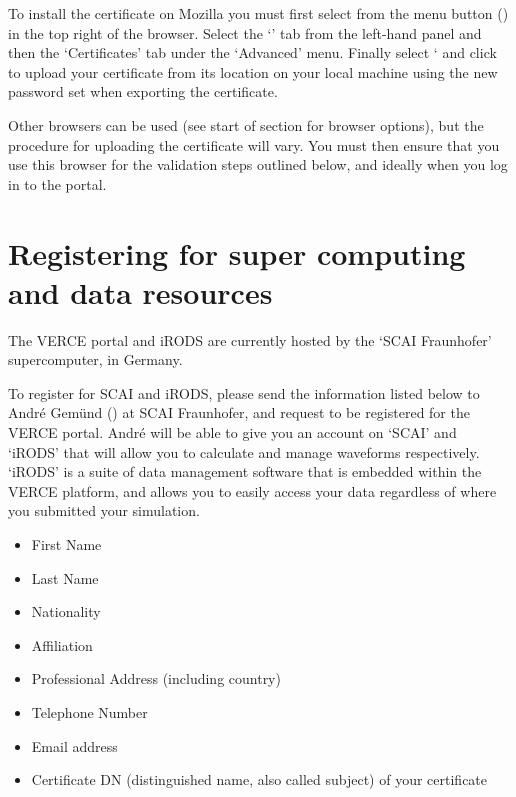 \documentclass[english]{book}
\begin{document}
To install the certificate on Mozilla you must first select
 from the menu button () in the top right
of the browser. Select the ‘’ tab from the left-hand panel
and then the ‘Certificates’ tab under the ‘Advanced’ menu. Finally
select ‘ and click  to upload your
certificate from its location on your local machine using the new
password set when exporting the certificate.

Other browsers can be used (see start of section for browser options),
but the procedure for uploading the certificate will vary. You must then
ensure that you use this browser for the validation steps outlined
below, and ideally when you log in to the portal.


\section{Registering for super computing and data resources}
\label{\detokenize{Section3:registering-for-super-computing-and-data-resources}}
The VERCE portal and iRODS are currently hosted by the ‘SCAI Fraunhofer’
supercomputer, in Germany.

To register for SCAI and iRODS, please send the information listed below to André Gemünd () at
SCAI Fraunhofer, and request to be registered for the VERCE portal.
André will be able to give you an account on ‘SCAI’ and ‘iRODS’ that
will allow you to calculate and manage waveforms respectively. ‘iRODS’
is a suite of data management software that is embedded within the VERCE
platform, and allows you to easily access your data regardless of where
you submitted your simulation.
\begin{itemize}
\item {} 
First Name

\item {} 
Last Name

\item {} 
Nationality

\item {} 
Affiliation

\item {} 
Professional Address (including country)

\item {} 
Telephone Number

\item {} 
Email address

\item {} 
Certificate DN (distinguished name, also called subject) of your
certificate

\end{itemize}
\end{document}
